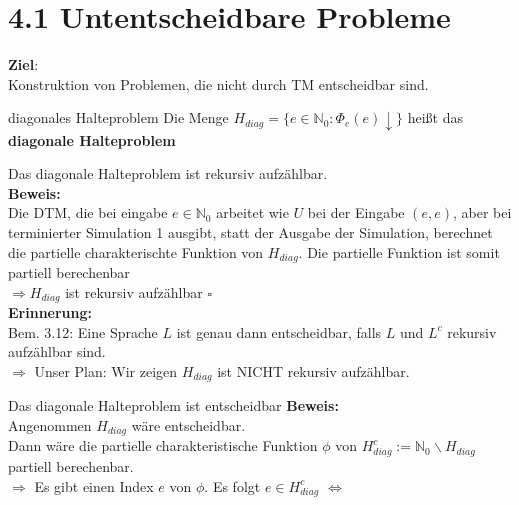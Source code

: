 
\section*{4.1 Untentscheidbare Probleme}

\textbf{Ziel}: \\
Konstruktion von Problemen, die nicht durch TM entscheidbar sind.

\begin{defn}{diagonales Halteproblem}
    Die Menge $H_{diag} = \{e \in \mathbb{N}_0 : \Phi_e(e) \downarrow\}$ heißt das \textbf{diagonale Halteproblem}
\end{defn}

\begin{prop}{}
    Das diagonale Halteproblem ist rekursiv aufzählbar. \\
    
    \textbf{Beweis:} \\
    Die DTM, die bei eingabe $e \in \mathbb{N}_0$ arbeitet wie $U$ bei
    der Eingabe $(e,e)$, aber bei terminierter Simulation 1 ausgibt, statt der
    Ausgabe der Simulation, berechnet die partielle charakterischte Funktion von $H_{diag}$.
    Die partielle Funktion ist somit partiell berechenbar \\
    $\Rightarrow H_{diag}$ ist rekursiv aufzählbar $\square$ \\

    \textbf{Erinnerung:} \\
    Bem. 3.12: Eine Sprache $L$ ist genau dann entscheidbar, falls $L$ und $L^c$
    rekursiv aufzählbar sind. \\

    $\Rightarrow$ Unser Plan: Wir zeigen $H_{diag}$ ist NICHT rekursiv aufzählbar.
\end{prop}

\begin{satz}{Das diagonale Halteproblem ist entscheidbar}
    \textbf{Beweis:} \\
    Angenommen $H_{diag}$ wäre entscheidbar. \\
    Dann wäre die partielle charakteristische Funktion $\phi$ von $H_{diag}^c := \mathbb{N}_0 \backslash H_{diag}$
    partiell berechenbar. \\

    $\Rightarrow$ Es gibt einen Index $e$ von $\phi$. Es folgt $e \in H_{diag}^c$
    $\Leftrightarrow$ 



\end{satz}